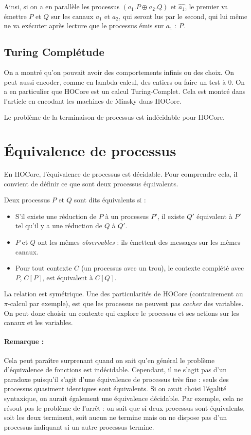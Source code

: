 \documentclass[11pt]{article}
\def\pic{$\pi$-calcul }
\def\+{\oplus}
\begin{document}
Ainsi, si on a en parallèle les processus $(a_1.P\+ a_2.Q)$ et  $\hat{a_1}$, le premier va émettre $P$ et $Q$ sur les canaux $a_1$ et $a_2$, qui seront lus par le second, qui lui même ne va exécuter après lecture que le processus émis sur $a_1$ : $P$. 

\subsection{Turing Complétude}
On a montré qu'on pouvait avoir des comportements infinis ou des choix. On peut aussi encoder, comme en lambda-calcul, des entiers ou faire un test à 0. %
On a en particulier que HOCore est un calcul Turing-Complet.
Cela est montré dans l'article \cite{expressiveness} en encodant les machines de Minsky dans HOCore.

Le problème de la terminaison de processus est indécidable pour HOCore.


\section{Équivalence de processus}
En HOCore, l'équivalence de processus est décidable. Pour comprendre cela, il convient de définir ce que sont deux processus équivalents.

Deux processus $P$ et $Q$ sont dits équivalents si :
\begin{itemize}
\item S'il existe une réduction de $P$ à un processus $P'$, il existe $Q'$ équivalent à $P'$ tel qu'il y a une réduction de $Q$ à $Q'$. 
\item $P$ et $Q$ ont les mêmes \textit{observables} : ils émettent des messages sur les mêmes canaux.  
\item Pour tout contexte $C$ (un processus avec un trou), le contexte complété avec $P$, $C[P]$, est équivalent à $C[Q]$.
\end{itemize}
La relation est symétrique. Une des particularités de HOCore (contrairement au \pic par exemple), est que les processus ne peuvent pas \textit{cacher} des variables. On peut donc choisir un contexte qui explore le processus et ses actions sur les canaux et les variables. 


\paragraph{Remarque :} Cela peut paraître surprenant quand on sait qu'en général le problème d'équivalence de fonctions est indécidable. Cependant, il ne s'agit pas d'un paradoxe puisqu'il s'agit d'une équivalence de processus très fine : seuls des processus quasiment identiques sont équivalents. Si on avait choisi l'égalité syntaxique, on aurait également une équivalence décidable.  Par exemple, cela ne résout pas le problème de l'arrêt : on sait que si deux processus sont équivalents, soit les deux terminent, soit aucun ne termine mais on ne dispose pas d'un processus indiquant si un autre processus termine. 
\end{document}
